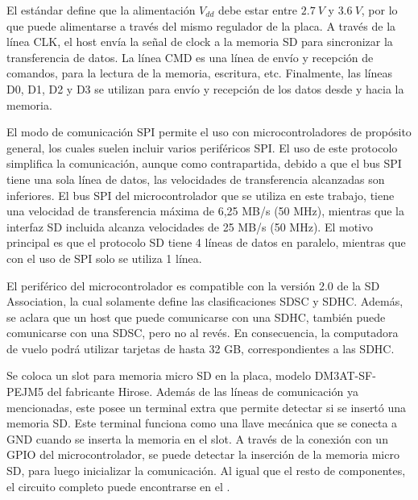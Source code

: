 El estándar define que la alimentación $V_{dd}$ debe estar entre $2.7 \ V$ y $3.6 \ V$, por lo que puede alimentarse a través del mismo regulador de la placa. A través de la línea CLK, el host envía la señal de clock a la memoria SD para sincronizar la transferencia de datos. La línea CMD es una línea de envío y recepción de comandos, para la lectura de la memoria, escritura, etc. Finalmente, las líneas D0, D1, D2 y D3 se utilizan para envío y recepción de los datos desde y hacia la memoria.

El modo de comunicación SPI permite el uso con microcontroladores de propósito general, los cuales suelen incluir varios periféricos SPI. El uso de este protocolo simplifica la comunicación, aunque como  contrapartida, debido a que el bus SPI tiene una sola línea de datos, las velocidades de transferencia alcanzadas son inferiores. El bus SPI del microcontrolador que se utiliza en este trabajo, tiene una velocidad de transferencia máxima de 6,25 MB/s (50 MHz), mientras que la interfaz SD incluida alcanza velocidades de 25 MB/s (50 MHz). El motivo principal es que el protocolo SD tiene 4 líneas de datos en paralelo, mientras que con el uso de SPI solo se utiliza 1 línea.

El periférico del microcontrolador es compatible con la versión 2.0 de la SD Association, la cual solamente define las clasificaciones SDSC y SDHC. Además, se aclara que un host que puede comunicarse con una SDHC, también puede comunicarse con una SDSC, pero no al revés. En consecuencia, la computadora de vuelo podrá utilizar tarjetas de hasta 32 GB, correspondientes a las SDHC.


Se coloca un slot para memoria micro SD en la placa, modelo DM3AT-SF-PEJM5 del fabricante Hirose. Además de las líneas de comunicación ya mencionadas, este posee un terminal extra que permite detectar si se insertó una memoria SD. Este terminal funciona como una llave mecánica que se conecta a GND cuando se inserta la memoria en el slot. A través de la conexión con un GPIO del microcontrolador, se puede detectar la inserción de la memoria micro SD, para luego inicializar la comunicación. Al igual que el resto de componentes, el circuito completo puede encontrarse en el .

